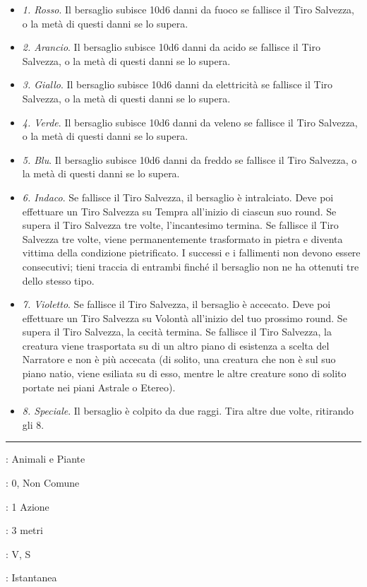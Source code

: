 \begin{multicols}{2}
\begin{itemize}[leftmargin=*] \setlength{\itemsep}{0pt}
	\item \emph{1. Rosso}. Il bersaglio subisce 10d6 danni da fuoco se fallisce il Tiro Salvezza, o la metà di questi danni se lo supera.
	\item \emph{2. Arancio}. Il bersaglio subisce 10d6 danni da acido se fallisce il Tiro Salvezza, o la metà di questi danni se lo supera.
	\item \emph{3. Giallo}. Il bersaglio subisce 10d6 danni da elettricità se fallisce il Tiro Salvezza, o la metà di questi danni se lo supera.
	\item \emph{4. Verde}. Il bersaglio subisce 10d6 danni da veleno se fallisce il Tiro Salvezza, o la metà di questi danni se lo supera.
	\item \emph{5. Blu}. Il bersaglio subisce 10d6 danni da freddo se fallisce il Tiro Salvezza, o la metà di questi danni se lo supera.
	\item \emph{6. Indaco}. Se fallisce il Tiro Salvezza, il bersaglio è intralciato. Deve poi effettuare un Tiro Salvezza su Tempra all'inizio di ciascun suo round. Se supera il Tiro Salvezza tre volte, l'incantesimo termina. Se fallisce il Tiro Salvezza tre volte, viene permanentemente trasformato in pietra e diventa vittima della condizione pietrificato. I successi e i fallimenti non devono essere consecutivi; tieni traccia di entrambi finché il bersaglio non ne ha ottenuti tre dello stesso tipo.
	\item \emph{7. Violetto}. Se fallisce il Tiro Salvezza, il bersaglio è accecato. Deve poi effettuare un Tiro Salvezza su Volontà all'inizio del tuo prossimo round. Se supera il Tiro Salvezza, la cecità termina. Se fallisce il Tiro Salvezza, la creatura viene trasportata su di un altro piano di esistenza a scelta del Narratore e non è più accecata (di solito, una creatura che non è sul suo piano natio, viene esiliata su di esso, mentre le altre creature sono di solito portate nei piani Astrale o Etereo).
	\item \emph{8. Speciale}. Il bersaglio è colpito da due raggi. Tira altre due volte, ritirando gli 8.

\end{itemize}

\smallskip\noindent\rule{\linewidth}{2pt} \hypertarget{Spruzzo Velenoso}{}\smallskip{}
\noindent
\begin{description}[noitemsep, topsep=0pt, parsep=0pt, partopsep=0pt, leftmargin=0cm, labelwidth=2.8cm]
	\item[\textbf{Lista di Magia}]: Animali e Piante
	\item[\textbf{Livello}]: 0, Non Comune
	\item[\textbf{T. di Lancio}]: 1 Azione
	\item[\textbf{Gittata}]: 3 metri
	\item[\textbf{Componenti}]: V, S
	\item[\textbf{Durata}]: Istantanea
\end{description}


\end{multicols}
